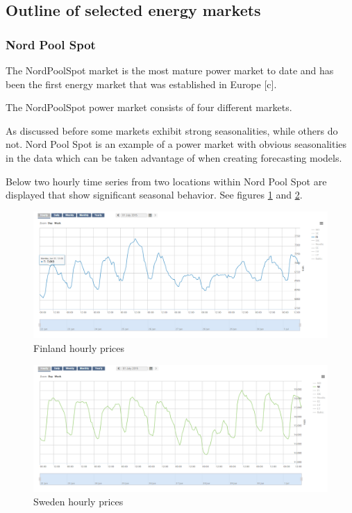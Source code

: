 \subsection{Outline of selected energy markets}



\subsubsection{Nord Pool Spot}


The NordPoolSpot market is the most mature power market to date and has been the first energy market that was established in Europe [c]. 

The NordPoolSpot power market consists of four different markets. %


As discussed before some markets exhibit strong seasonalities, while others do not. Nord Pool Spot is an example of a power market with obvious seasonalities in the data which can be taken advantage of when creating forecasting models. 

Below two hourly time series from two locations within Nord Pool Spot are displayed that show significant seasonal behavior. 
See figures \ref{fig:hourly_prices_finland} and \ref{fig:hourly_prices_sweden}.

\begin{figure}[!h]
	\centering
		\includegraphics[width=1.00\textwidth]{figures/methodology/hourly_prices_finland.PNG}
	\caption{Finland hourly prices}
	\label{fig:hourly_prices_finland}
\end{figure}

\begin{figure}[!h]
	\centering
		\includegraphics[width=1.00\textwidth]{figures/methodology/hourly_prices_sweden.PNG}
	\caption{Sweden hourly prices}
	\label{fig:hourly_prices_sweden}
\end{figure}




